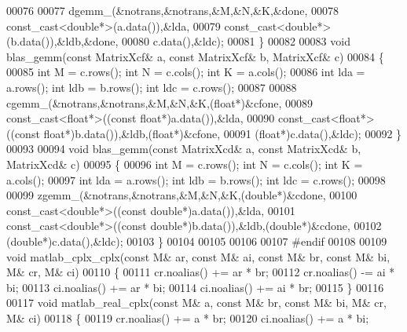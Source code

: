 \begin{DoxyCode}
00076 
00077   dgemm\_(&notrans,&notrans,&M,&N,&K,&done,
00078          const\_cast<double*>(a.data()),&lda,
00079          const\_cast<double*>(b.data()),&ldb,&done,
00080          c.data(),&ldc);
00081 \}
00082 
00083 \textcolor{keywordtype}{void} blas\_gemm(\textcolor{keyword}{const} MatrixXcf& a, \textcolor{keyword}{const} MatrixXcf& b, MatrixXcf& c)
00084 \{
00085   \textcolor{keywordtype}{int} M = c.rows(); \textcolor{keywordtype}{int} N = c.cols(); \textcolor{keywordtype}{int} K = a.cols();
00086   \textcolor{keywordtype}{int} lda = a.rows(); \textcolor{keywordtype}{int} ldb = b.rows(); \textcolor{keywordtype}{int} ldc = c.rows();
00087 
00088   cgemm\_(&notrans,&notrans,&M,&N,&K,(\textcolor{keywordtype}{float}*)&cfone,
00089          const\_cast<float*>((\textcolor{keyword}{const} \textcolor{keywordtype}{float}*)a.data()),&lda,
00090          const\_cast<float*>((\textcolor{keyword}{const} \textcolor{keywordtype}{float}*)b.data()),&ldb,(\textcolor{keywordtype}{float}*)&cfone,
00091          (\textcolor{keywordtype}{float}*)c.data(),&ldc);
00092 \}
00093 
00094 \textcolor{keywordtype}{void} blas\_gemm(\textcolor{keyword}{const} MatrixXcd& a, \textcolor{keyword}{const} MatrixXcd& b, MatrixXcd& c)
00095 \{
00096   \textcolor{keywordtype}{int} M = c.rows(); \textcolor{keywordtype}{int} N = c.cols(); \textcolor{keywordtype}{int} K = a.cols();
00097   \textcolor{keywordtype}{int} lda = a.rows(); \textcolor{keywordtype}{int} ldb = b.rows(); \textcolor{keywordtype}{int} ldc = c.rows();
00098 
00099   zgemm\_(&notrans,&notrans,&M,&N,&K,(\textcolor{keywordtype}{double}*)&cdone,
00100          const\_cast<double*>((\textcolor{keyword}{const} \textcolor{keywordtype}{double}*)a.data()),&lda,
00101          const\_cast<double*>((\textcolor{keyword}{const} \textcolor{keywordtype}{double}*)b.data()),&ldb,(\textcolor{keywordtype}{double}*)&cdone,
00102          (\textcolor{keywordtype}{double}*)c.data(),&ldc);
00103 \}
00104 
00105 
00106 
00107 \textcolor{preprocessor}{#endif}
00108 
00109 \textcolor{keywordtype}{void} matlab\_cplx\_cplx(\textcolor{keyword}{const} M& ar, \textcolor{keyword}{const} M& ai, \textcolor{keyword}{const} M& br, \textcolor{keyword}{const} M& bi, M& cr, M& ci)
00110 \{
00111   cr.noalias() += ar * br;
00112   cr.noalias() -= ai * bi;
00113   ci.noalias() += ar * bi;
00114   ci.noalias() += ai * br;
00115 \}
00116 
00117 \textcolor{keywordtype}{void} matlab\_real\_cplx(\textcolor{keyword}{const} M& a, \textcolor{keyword}{const} M& br, \textcolor{keyword}{const} M& bi, M& cr, M& ci)
00118 \{
00119   cr.noalias() += a * br;
00120   ci.noalias() += a * bi;

\end{DoxyCode}
